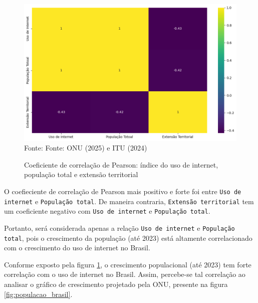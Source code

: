 \begin{figure}[ht]
    \centering
    \caption{Coeficiente de correlação de Pearson: índice do uso de internet, população total e extensão territorial}
    \includegraphics[width=1\linewidth]{figuras/internet/correlacao.png}
    \label{fig:internet_correlacao}
    \footnotesize{Fonte: Fonte: ONU (2025) e ITU (2024)}
\end{figure}

\newpage
O coefieciente de correlação de Pearson mais positivo e forte foi entre \texttt{Uso de internet} e \texttt{População total}. De maneira contraria, \texttt{Extensão territorial} tem um coeficiente negativo com \texttt{Uso de internet} e \texttt{População total}. 

Portanto, será considerada apenas a relação \texttt{Uso de internet} e \texttt{População total}, pois o crescimento da população (até 2023) está altamente correlacionado com o crescimento do uso de internet no Brasil.

Conforme exposto pela figura \ref{fig:internet_correlacao}, o crescimento populacional (até 2023) tem forte correlação com o uso de  internet no Brasil. Assim, percebe-se tal correlação ao analisar o gráfico de crescimento projetado pela ONU, presente na figura \ref{fig:populacao_brasil}.

